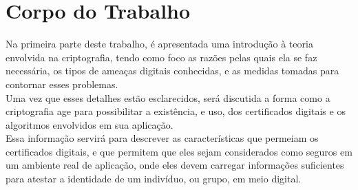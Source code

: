\section[Corpo do Trabalho]{Corpo do Trabalho}
	
	Na primeira parte deste trabalho, é apresentada uma introdução à teoria envolvida na criptografia, tendo como foco as razões pelas quais ela se faz necessária, os tipos de ameaças digitais conhecidas, e as medidas tomadas para contornar esses problemas.\\
	
	Uma vez que esses detalhes estão esclarecidos, será discutida a forma como a criptografia age para possibilitar a existência, e uso, dos certificados digitais e os algoritmos envolvidos em sua aplicação.\\
	
	Essa informação servirá para descrever as características que permeiam os certificados digitais, e que permitem que eles sejam considerados como seguros em um ambiente real de aplicação, onde eles devem carregar informações suficientes para atestar a identidade de um indivíduo, ou grupo, em meio digital.\\
